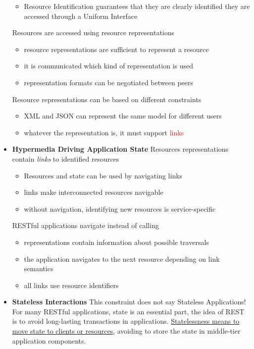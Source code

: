 \documentclass[10pt,a4paper]{article}
\begin{document}
\begin{itemize}
\begin{itemize}
 		\item Resource Identification guarantees that they are clearly identified they are accessed through a Uniform Interface
 	\end{itemize}
 	Resources are accessed using resource representations
 	\begin{itemize}
 	   \item resource representations are sufficient to represent a resource 	     
 	   \item it is communicated which kind of representation is used
 	   \item representation formats can be negotiated between peers
 	\end{itemize}
 	Resource representations can be based on different constraints
 	\begin{itemize}
 		\item XML and JSON can represent the same model for different users 
 		\item whatever the representation is, it must support \textcolor{red}{links}
 	\end{itemize}
 	\item \textbf{Hypermedia Driving Application State}
 	Resources representations contain \textit{links} to identified resources
 	\begin{itemize}
 		\item Resources and state can be used by navigating links
 		\item links make interconnected resources navigable
 		\item without navigation, identifying new resources is service-specific
 	\end{itemize}
 	RESTful applications navigate instead of calling
 	\begin{itemize}
 		\item representations contain information about possible traversals
 		\item the application navigates to the next resource depending on link semantics
 		\item all links use resource identifiers
 	\end{itemize}
 	\item \textbf{Stateless Interactions} This constraint does not say Stateless Applications! For many RESTful applications, state is an essential part, the idea of REST is to avoid long-lasting transactions in applications. \uline{Statelessness means to move state to clients or resources}, avoiding to store the state in middle-tier application components. \\ \pagebreak

\end{itemize}
\end{document}
